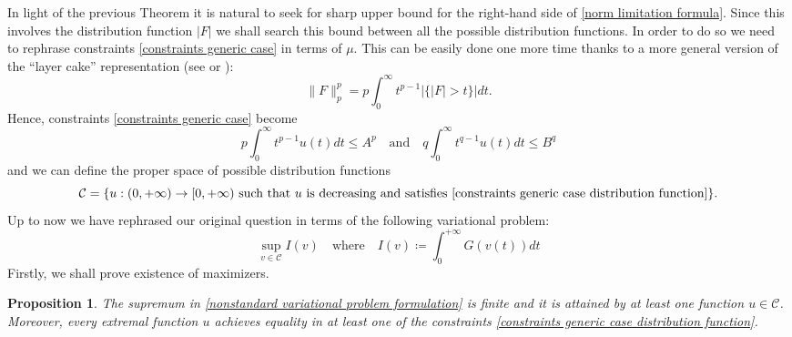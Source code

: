 \documentclass[corpo=11pt, stile=classica, tipotesi=custom,
greek, evenboxes, english]{toptesi}
\numberwithin{equation}{chapter}
\newtheorem{prop}[teo]{Proposition}
\begin{document}
In light of the previous Theorem it is natural to seek for sharp upper bound for the right-hand side of \eqref{norm limitation formula}. Since this involves the distribution function $|F|$ we shall search this bound between all the possible distribution functions. In order to do so we need to rephrase constraints \eqref{constraints generic case} in terms of $\mu$. This can be easily done one more time thanks to a more general version of the ``layer cake'' representation (see \cite[][Theorem 1.13]{liebloss} or \cite[][Proposition 1.1.4]{grafakos}):
\begin{equation*}
	\|F\|_p^p = p \int_0^{\infty} t^{p-1}|\{|F|>t\}|dt.
\end{equation*}
Hence, constraints \eqref{constraints generic case} become
\begin{equation}\label{constraints generic case distribution function}
	p \int_0^{\infty} t^{p-1} u(t)dt \leq A^p \quad \text{and} \quad q \int_0^{\infty} t^{q-1} u(t)dt \leq B^q
\end{equation}
and we can define the proper space of possible distribution functions
\begin{equation}\label{distribution function space}
	\mathcal{C} = \{u : (0,+\infty) \rightarrow [0,+\infty) \text{ such that } u \text{ is decreasing and satisfies } \eqref{constraints generic case distribution function}\}.
\end{equation}
Up to now we have rephrased our original question in terms of the following variational problem:
\begin{equation}\label{nonstandard variational problem formulation}
	\sup_{v \in \mathcal{C}} I(v) \quad \text{where} \quad I(v) \coloneqq \int_0^{+\infty} G(v(t))dt
\end{equation}
Firstly, we shall prove existence of maximizers.
\begin{prop}\label{existence of maximizer}
	The supremum in \eqref{nonstandard variational problem formulation} is finite and it is attained by at least one function $u \in \mathcal{C}$. Moreover, every extremal function $u$ achieves equality in at least one of the constraints \eqref{constraints generic case distribution function}.
\end{prop}
\end{document}
